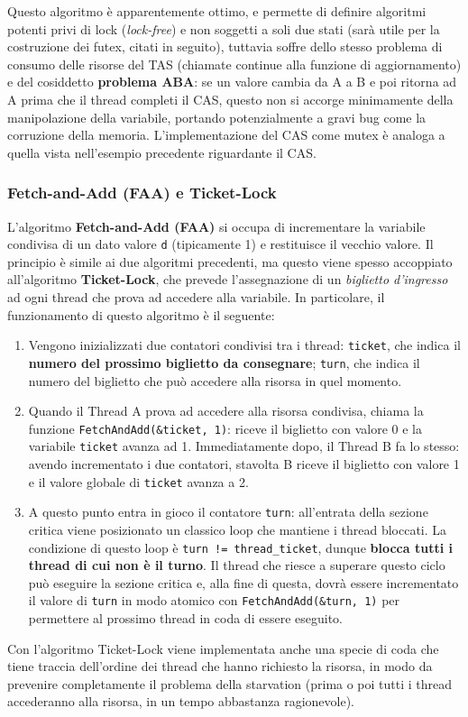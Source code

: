 \documentclass[12pt]{report}
\begin{document}
	Questo algoritmo è apparentemente ottimo, e permette di definire algoritmi potenti privi di lock (\textit{lock-free}) e non soggetti a soli due stati (sarà utile per la costruzione dei futex, citati in seguito), tuttavia soffre dello stesso problema di consumo delle risorse del TAS (chiamate continue alla funzione di aggiornamento) e del cosiddetto \textbf{problema ABA}: se un valore cambia da A a B e poi ritorna ad A prima che il thread completi il CAS, questo non si accorge minimamente della manipolazione della variabile, portando potenzialmente a gravi bug come la corruzione della memoria.
	L'implementazione del CAS come mutex è analoga a quella vista nell'esempio precedente riguardante il CAS.
	
	\subsubsection*{Fetch-and-Add (FAA) e Ticket-Lock}
	L'algoritmo \textbf{Fetch-and-Add (FAA)} si occupa di incrementare la variabile condivisa di un dato valore \texttt{d} (tipicamente 1) e restituisce il vecchio valore. Il principio è simile ai due algoritmi precedenti, ma questo viene spesso accoppiato all'algoritmo \textbf{Ticket-Lock}, che prevede l'assegnazione di un \textit{biglietto d'ingresso} ad ogni thread che prova ad accedere alla variabile. In particolare, il funzionamento di questo algoritmo è il seguente:
	\begin{enumerate}
		\item Vengono inizializzati due contatori condivisi tra i thread: \texttt{ticket}, che indica il \textbf{numero del prossimo biglietto da consegnare}; \texttt{turn}, che indica il numero del biglietto che può accedere alla risorsa in quel momento.
		
		\item Quando il Thread A prova ad accedere alla risorsa condivisa, chiama la funzione \texttt{FetchAndAdd(\&ticket, 1)}: riceve il biglietto con valore 0 e la variabile \texttt{ticket} avanza ad 1. Immediatamente dopo, il Thread B fa lo stesso: avendo incrementato i due contatori, stavolta B riceve il biglietto con valore 1 e il valore globale di \texttt{ticket} avanza a 2.
		
		\item A questo punto entra in gioco il contatore \texttt{turn}: all'entrata della sezione critica viene posizionato un classico loop che mantiene i thread bloccati. La condizione di questo loop è \texttt{turn != thread\_ticket}, dunque \textbf{blocca tutti i thread di cui non è il turno}. Il thread che riesce a superare questo ciclo può eseguire la sezione critica e, alla fine di questa, dovrà essere incrementato il valore di \texttt{turn} in modo atomico con \texttt{FetchAndAdd(\&turn, 1)} per permettere al prossimo thread in coda di essere eseguito.
	\end{enumerate}
	Con l'algoritmo Ticket-Lock viene implementata anche una specie di coda che tiene traccia dell'ordine dei thread che hanno richiesto la risorsa, in modo da prevenire completamente il problema della starvation (prima o poi tutti i thread accederanno alla risorsa, in un tempo abbastanza ragionevole).
	
\end{document}
